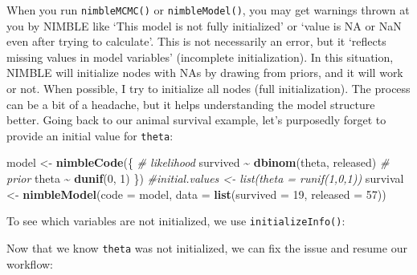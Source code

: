 \documentclass[
  12pt,
]{krantz}
\newenvironment{Shaded}{\begin{snugshade}}{\end{snugshade}}
\newcommand{\AttributeTok}[1]{\textcolor[rgb]{0.13,0.29,0.53}{#1}}
\newcommand{\CommentTok}[1]{\textcolor[rgb]{0.56,0.35,0.01}{\textit{#1}}}
\newcommand{\DecValTok}[1]{\textcolor[rgb]{0.00,0.00,0.81}{#1}}
\newcommand{\FunctionTok}[1]{\textcolor[rgb]{0.13,0.29,0.53}{\textbf{#1}}}
\newcommand{\NormalTok}[1]{#1}
\newcommand{\OtherTok}[1]{\textcolor[rgb]{0.56,0.35,0.01}{#1}}
\newcommand{\SpecialCharTok}[1]{\textcolor[rgb]{0.81,0.36,0.00}{\textbf{#1}}}
\begin{document}
When you run \texttt{nimbleMCMC()} or \texttt{nimbleModel()}, you may get warnings thrown at you by NIMBLE like `This model is not fully initialized' or `value is NA or NaN even after trying to calculate'. This is not necessarily an error, but it `reflects missing values in model variables' (incomplete initialization). In this situation, NIMBLE will initialize nodes with NAs by drawing from priors, and it will work or not. When possible, I try to initialize all nodes (full initialization). The process can be a bit of a headache, but it helps understanding the model structure better. Going back to our animal survival example, let's purposedly forget to provide an initial value for \texttt{theta}:

\begin{Shaded}
\begin{Highlighting}[]
\NormalTok{model }\OtherTok{\textless{}{-}} \FunctionTok{nimbleCode}\NormalTok{(\{}
  \CommentTok{\# likelihood}
\NormalTok{  survived }\SpecialCharTok{\textasciitilde{}} \FunctionTok{dbinom}\NormalTok{(theta, released)}
  \CommentTok{\# prior}
\NormalTok{  theta }\SpecialCharTok{\textasciitilde{}} \FunctionTok{dunif}\NormalTok{(}\DecValTok{0}\NormalTok{, }\DecValTok{1}\NormalTok{)}
\NormalTok{\})}
\CommentTok{\#initial.values \textless{}{-} list(theta = runif(1,0,1))}
\NormalTok{survival }\OtherTok{\textless{}{-}} \FunctionTok{nimbleModel}\NormalTok{(}\AttributeTok{code =}\NormalTok{ model, }
                        \AttributeTok{data =} \FunctionTok{list}\NormalTok{(}\AttributeTok{survived =} \DecValTok{19}\NormalTok{, }\AttributeTok{released =} \DecValTok{57}\NormalTok{))}
\end{Highlighting}
\end{Shaded}

To see which variables are not initialized, we use \texttt{initializeInfo()}:

\begin{Shaded}
\end{Shaded}

Now that we know \texttt{theta} was not initialized, we can fix the issue and resume our workflow:
\end{document}
